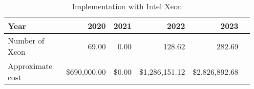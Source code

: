 \tiny \begin{longtable} { |p{}  |r  |r  |r  |r  |r |} 
\caption{Implementation with Intel Xeon \label{tab:Xeon}}\\ 
\hline 
\textbf{Year}&\textbf{2020}&\textbf{2021}&\textbf{2022}&\textbf{2023} \\ \hline
{Number of Xeon}&{69.00}&{0.00}&{128.62}&{282.69} \\ \hline
{Approximate cost}&{\$690,000.00}&{\$0.00}&{\$1,286,151.12}&{\$2,826,892.68} \\ \hline
\end{longtable} \normalsize
